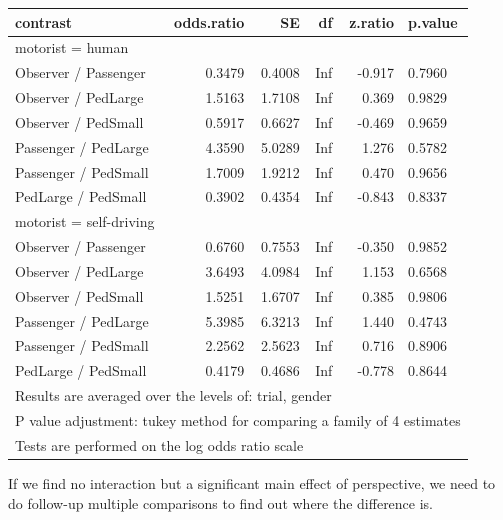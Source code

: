 \documentclass{scrartcl}\usepackage[]{graphicx}\usepackage[]{color}
\begin{document}
\begin{table}[ht]
\centering
\begin{tabular}{lrrrrl}
  \hline
contrast & odds.ratio & SE & df & z.ratio & p.value \\ 
  \hline
\multicolumn{6}{l}{motorist = human}\\
Observer / Passenger & 0.3479 & 0.4008 & Inf & -0.917 & 0.7960 \\ 
  Observer / PedLarge & 1.5163 & 1.7108 & Inf & 0.369 & 0.9829 \\ 
  Observer / PedSmall & 0.5917 & 0.6627 & Inf & -0.469 & 0.9659 \\ 
  Passenger / PedLarge & 4.3590 & 5.0289 & Inf & 1.276 & 0.5782 \\ 
  Passenger / PedSmall & 1.7009 & 1.9212 & Inf & 0.470 & 0.9656 \\ 
  PedLarge / PedSmall & 0.3902 & 0.4354 & Inf & -0.843 & 0.8337 \\ 
   \hline
\multicolumn{6}{l}{motorist = self-driving}\\
Observer / Passenger & 0.6760 & 0.7553 & Inf & -0.350 & 0.9852 \\ 
  Observer / PedLarge & 3.6493 & 4.0984 & Inf & 1.153 & 0.6568 \\ 
  Observer / PedSmall & 1.5251 & 1.6707 & Inf & 0.385 & 0.9806 \\ 
  Passenger / PedLarge & 5.3985 & 6.3213 & Inf & 1.440 & 0.4743 \\ 
  Passenger / PedSmall & 2.2562 & 2.5623 & Inf & 0.716 & 0.8906 \\ 
  PedLarge / PedSmall & 0.4179 & 0.4686 & Inf & -0.778 & 0.8644 \\ 
   \hline
\multicolumn{6}{l}{{\footnotesize Results are averaged over the levels of: trial, gender}}\\

\multicolumn{6}{l}{{\footnotesize P value adjustment: tukey method for comparing a family of 4 estimates}}\\

\multicolumn{6}{l}{{\footnotesize Tests are performed on the log odds ratio scale}}\\
\end{tabular}
\end{table}


If we find no interaction but a significant main effect of
perspective, we need to do follow-up multiple comparisons to find out
where the difference is.
\end{document}
